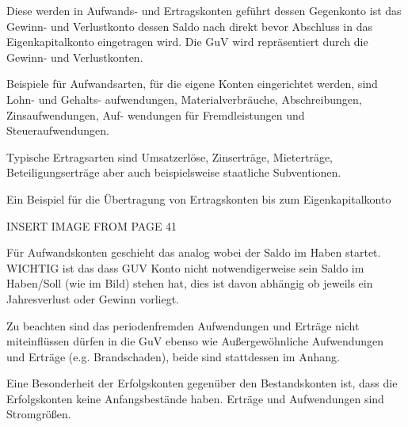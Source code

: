 Diese werden in Aufwands- und Ertragskonten geführt dessen Gegenkonto ist das 
Gewinn- und Verlustkonto dessen Saldo nach direkt bevor Abschluss in das Eigenkapitalkonto 
eingetragen wird. Die GuV wird repräsentiert durch die Gewinn- und Verlustkonten.


Beispiele für Aufwandsarten, für die eigene Konten eingerichtet werden, sind Lohn- und Gehalts-
aufwendungen, Materialverbräuche, Abschreibungen, Zinsaufwendungen, Auf-
wendungen für Fremdleistungen und Steueraufwendungen.

Typische Ertragsarten sind Umsatzerlöse, Zinserträge, Mieterträge, Beteiligungserträge 
aber auch beispielsweise staatliche Subventionen.

Ein Beispiel für die Übertragung von Ertragskonten bis zum Eigenkapitalkonto

INSERT IMAGE FROM PAGE 41

Für Aufwandskonten geschieht das analog wobei der Saldo im Haben startet.
WICHTIG ist das dass GUV Konto nicht notwendigerweise sein Saldo im Haben/Soll (wie im Bild) stehen 
hat, dies ist davon abhängig ob jeweils ein Jahresverlust oder Gewinn vorliegt.

Zu beachten sind das periodenfremden Aufwendungen und Erträge nicht miteinflüssen dürfen in die GuV
ebenso wie Außergewöhnliche Aufwendungen und Erträge (e.g. Brandschaden), beide sind stattdessen im Anhang.


Eine Besonderheit der Erfolgskonten gegenüber den Bestandskonten ist, dass die
Erfolgskonten keine Anfangsbestände haben. Erträge und Aufwendungen sind
Stromgrößen.
